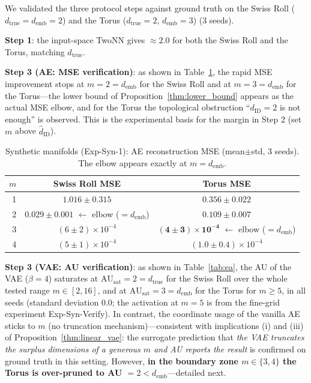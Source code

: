 \documentclass[make,article,submit,pdftex,moreauthors]{Definitions/mdpi}
\newcommand{\dID}{d_{\mathrm{ID}}}
\newcommand{\hatdID}{\hat{d}_{\mathrm{ID}}}
\newcommand{\dtrue}{d_{\mathrm{true}}}
\newcommand{\AUsat}{\mathrm{AU}_{\mathrm{sat}}}
\newcommand{\demb}{d_{\mathrm{emb}}}
\begin{document}
We validated the three protocol steps against ground truth on the Swiss Roll
($\dtrue = \demb = 2$) and the Torus ($\dtrue = 2$, $\demb = 3$)
(3 seeds).

\textbf{Step 1}: the input-space TwoNN gives $\approx 2.0$ for both the
Swiss Roll and the Torus, matching $\dtrue$.

\textbf{Step 3 (AE: MSE verification)}: as shown in Table~\ref{tab:e1}, the
rapid MSE improvement stops at $m = 2 = \demb$ for the Swiss Roll and at
$m = 3 = \demb$ for the Torus---the lower bound of
Proposition~\ref{thm:lower_bound} appears as the actual MSE elbow, and for
the Torus the topological obstruction ``$\dID = 2$ is not enough'' is
observed.
This is the experimental basis for the margin in Step 2 (set $m$ above
$\hatdID$).

\begin{table}[H]
\caption{Synthetic manifolds (Exp-Syn-1): AE reconstruction MSE
(mean$\pm$std, 3 seeds). The elbow appears exactly at $m = \demb$.}
\label{tab:e1}
\small
\begin{tabular}{rcc}
\toprule
$m$ & \textbf{Swiss Roll MSE} & \textbf{Torus MSE} \\
\midrule
1 & $1.016 \pm 0.315$ & $0.356 \pm 0.022$ \\
2 & $\boldsymbol{0.029 \pm 0.001}$ $\leftarrow$ elbow ($= \demb$) & $0.109 \pm 0.007$ \\
3 & $(6 \pm 2) \times 10^{-4}$ & $\boldsymbol{(4 \pm 3) \times 10^{-4}}$ $\leftarrow$ elbow ($= \demb$) \\
4 & $(5 \pm 1) \times 10^{-4}$ & $(1.0 \pm 0.4) \times 10^{-4}$ \\
\bottomrule
\end{tabular}
\end{table}

\textbf{Step 3 (VAE: AU verification)}: as shown in Table~\ref{tab:ea},
the AU of the VAE ($\beta = 4$) saturates at $\AUsat = 2 = \dtrue$ for the
Swiss Roll over the whole tested range $m \in [2, 16]$, and at
$\AUsat = 3 = \demb$ for the Torus for $m \geq 5$, in all seeds (standard
deviation 0.0; the activation at $m = 5$ is from the fine-grid experiment
Exp-Syn-Verify).
In contrast, the coordinate usage of the vanilla AE sticks to $m$ (no
truncation mechanism)---consistent with implications (i) and (iii) of
Proposition~\ref{thm:linear_vae}: the surrogate prediction that \textit{the
VAE truncates the surplus dimensions of a generous $m$ and AU reports the
result} is confirmed on ground truth in this setting.
However, \textbf{in the boundary zone $m \in \{3, 4\}$ the Torus is
over-pruned to AU $= 2 < \demb$}---detailed next.
\end{document}
